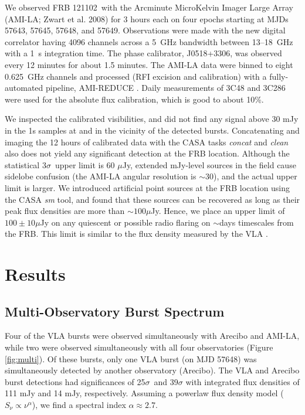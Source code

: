 \documentclass[twocolumn]{aastex61}
\newcommand{\frb}{FRB 121102}
\begin{document}
We observed \frb\ with the Arcminute MicroKelvin Imager Large Array (AMI-LA; Zwart et al. 2008) for 3 hours each on four epochs starting at MJDs 57643, 57645, 57648, and 57649. Observations were made with the new digital correlator having 4096 channels across a 5~GHz bandwidth between 13--18~GHz with a 1~s integration time. The phase calibrator, J0518+3306, was observed every 12 minutes for about 1.5 minutes. The AMI-LA data were binned to eight 0.625~GHz channels and processed (RFI excision and calibration) with a fully-automated pipeline, AMI-REDUCE \citep[e.g.,][]{2013MNRAS.429.3330P}. Daily measurements of 3C48 and 3C286 were used for the absolute flux calibration, which is good to about 10\%. 

We inspected the calibrated visibilities, and did not find any signal above 30 mJy in the 1s samples at and in the vicinity of the detected bursts. Concatenating and imaging the 12 hours of calibrated data with the CASA tasks {\it concat} and {\it clean} also does not yield any significant detection at the FRB location. Although the statistical $3\sigma$\ upper limit is 60 $\mu$Jy, extended mJy-level sources in the field cause sidelobe confusion (the AMI-LA angular resolution is $\sim$30\arcsec), and the actual upper limit is larger. We introduced artificial point sources at the FRB location using the CASA {\it sm} tool, and found that these sources can be recovered as long as their peak flux densities are more than $\sim100\mu$Jy. Hence, we place an upper limit of $100\pm10 \mu$Jy on any quiescent or possible radio flaring on $\sim$days timescales from the FRB. This limit is similar to the flux density measured by the VLA \citep{LOC}.

\section{Results}

\subsection{Multi-Observatory Burst Spectrum}
Four of the VLA bursts were observed simultaneously with Arecibo and AMI-LA, while two were observed simultaneously with all four observatories (Figure \ref{fig:multi}). Of these bursts, only one VLA burst (on MJD 57648) was simultaneously detected by another observatory (Arecibo). The VLA and Arecibo burst detections had significances of 25$\sigma$\ and 39$\sigma$ with integrated flux densities of 111 mJy and 14 mJy, respectively. Assuming a powerlaw flux density model ($S_{\nu} \propto \nu^{\alpha}$), we find a spectral index $\alpha\approx2.7$. 
\end{document}
